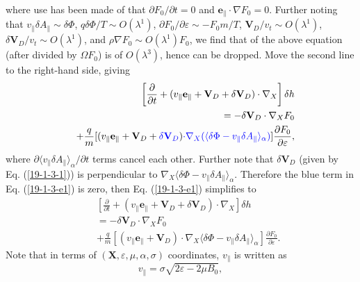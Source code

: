 \documentclass{article}
\newcommand{\tmcolor}[2]{{\color{#1}{#2}}}
\begin{document}
where use has been made of that $\partial F_0 / \partial t = 0$ and
$\mathbf{e}_{\parallel} \cdot \nabla F_0 = 0$. Further noting that
$v_{\parallel} \delta A_{\parallel} \sim \delta \Phi$, $q \delta \Phi / T \sim
O (\lambda^1)$, $\partial F_0 / \partial \varepsilon \sim - F_0 m / T$,
\quad$\mathbf{V}_D / v_t \sim O (\lambda^1)$, $\delta \mathbf{V}_D / v_t \sim
O (\lambda^1)$, and $\rho \nabla F_0 \sim O (\lambda^1) F_0$, we find that
\tmcolor{red}{the red term} of the above equation (after divided by $\Omega
F_0$) is of $O (\lambda^3)$, hence can be dropped. Move the second line to the
right-hand side, giving
\begin{eqnarray}
  &  & \left[ \frac{\partial}{\partial t} + (v_{\parallel}
  \mathbf{e}_{\parallel} +\mathbf{V}_D + \delta \mathbf{V}_D) \cdot \nabla_X
  \right] \delta h \nonumber\\
  &  & = - \delta \mathbf{V}_D \cdot \nabla_X F_0 \nonumber\\
  &  & + \frac{q}{m} [(v_{\parallel} \mathbf{e}_{\parallel} +\mathbf{V}_D +
  \tmcolor{blue}{\delta \mathbf{V}_D}) \tmcolor{blue}{\cdot \nabla_X (\langle
  \delta \Phi - v_{\parallel} \delta A_{\parallel} \rangle_{\alpha})}]
  \frac{\partial F_0}{\partial \varepsilon},  \label{19-1-3-e1}
\end{eqnarray}
where $\partial \langle v_{\parallel} \delta A_{\parallel} \rangle_{\alpha} /
\partial t$ terms cancel each other. Further note that $\delta \mathbf{V}_D$
(given by Eq. (\ref{19-1-3-1})) is perpendicular to $\nabla_X \langle \delta
\Phi - v_{\parallel} \delta A_{\parallel} \rangle_{\alpha}$. Therefore the
blue term in Eq. (\ref{19-1-3-e1}) is zero, then Eq. (\ref{19-1-3-e1})
simplifies to
\begin{eqnarray}
  &  & \left[ \frac{\partial}{\partial t} + (v_{\parallel}
  \mathbf{e}_{\parallel} +\mathbf{V}_D + \delta \mathbf{V}_D) \cdot \nabla_X
  \right] \delta h \nonumber\\
  &  & = - \delta \mathbf{V}_D \cdot \nabla_X F_0 \nonumber\\
  &  & + \frac{q}{m} [(v_{\parallel} \mathbf{e}_{\parallel} +\mathbf{V}_D)
  \cdot \nabla_X \langle \delta \Phi - v_{\parallel} \delta A_{\parallel}
  \rangle_{\alpha}] \frac{\partial F_0}{\partial \varepsilon} . 
  \label{19-1-4-e1}
\end{eqnarray}
Note that in terms of $(\mathbf{X}, \varepsilon, \mu, \alpha, \sigma)$
coordinates, $v_{\parallel}$ is written as
\begin{equation}
  \label{19-3-27-1} v_{\parallel} = \sigma \sqrt{2 \varepsilon - 2 \mu B_0},
\end{equation}
\end{document}
